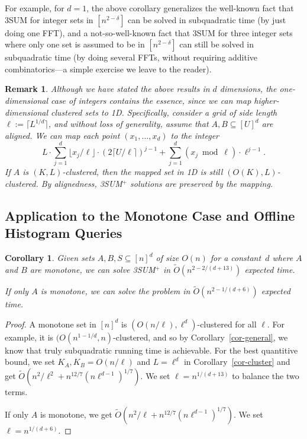 \documentclass[11pt]{article}
\newcommand{\LONG}[1]{#1}\newcommand{\SHORT}[1]{}
\newtheorem{corollary}[theorem]{Corollary}
\newtheorem{rmk}[theorem]{Remark}
\newenvironment{remark}{\begin{rmk}\em}{\end{rmk}}
\newcommand{\OO}{\widetilde{O}}
\begin{document}
For example, for $d=1$, the above corollary generalizes the well-known
fact that 3SUM for integer sets in $[n^{2-\delta}]$ can be
solved in subquadratic time (by just doing one FFT), and
a not-so-well-known fact that 3SUM for three integer sets where
only one set is assumed to be in $[n^{2-\delta}]$ can still be solved
in subquadratic time (by doing several FFTs, without requiring additive combinatorics---a simple exercise we leave to the reader).

\SHORT{
Although we have stated the above results in $d$ dimensions,
the one-dimensional case of integers contains the essence, since we can
map higher-dimensional clustered sets to 1D, as noted in the full
paper.
}
\LONG{
\begin{remark}
Although we have stated the above results in $d$ dimensions,
the one-dimensional case of integers contains the essence, since we can
map higher-dimensional clustered sets to 1D\@.
Specifically,
consider a grid of side length $\ell := \lceil L^{1/d}\rceil$, and
without loss of generality,
assume that $A,B\subseteq [U]^d$ are aligned.
We can map each point $(x_1,\ldots,x_d)$ to the integer
\[
 L\cdot \sum_{j=1}^d \lfloor x_j/\ell\rfloor\cdot (2\lceil U/\ell\rceil)^{j-1}
 + \sum_{j=1}^d (x_j\bmod{\ell})\cdot \ell^{j-1}.
\]
If $A$ is $(K,L)$-clustered, then the mapped set in 1D is
still $(O(K),L)$-clustered.  By alignedness,
3SUM$^+$ solutions are preserved by the mapping.
\end{remark}
}

\subsection{Application to the Monotone Case and Offline Histogram
Queries}

\begin{corollary}\label{cor-monotone-offline}
Given sets $A,B,S\subseteq [n]^d$ of size $O(n)$ for a constant~$d$
where $A$ and $B$ are monotone,
we can solve 3SUM$^+$ in
$\OO(n^{2-2/(d+13)})$ expected time.

If only $A$ is monotone, we can solve the
problem in $\OO(n^{2-1/(d+6)})$ expected time.
\end{corollary}
\begin{proof}
A monotone set in $[n]^d$ is $(O(n/\ell),\ell^d)$-clustered
for all $\ell$.  For example, it is $(O(n^{1-1/d},n)$-clustered,
and so by Corollary~\ref{cor-general}, we know that truly
subquadratic running time is achievable.
For the best quantitive bound, we set
$K_A,K_B=O(n/\ell)$ and $L=\ell^d$ in Corollary~\ref{cor-cluster}
and get
$\OO(n^2/\ell^2 + n^{12/7}(n\ell^{d-1})^{1/7}).$
We set $\ell = n^{1/(d+13)}$ to balance the two terms.

If only $A$ is monotone, we get
$\OO(n^2/\ell + n^{12/7}(n\ell^{d-1})^{1/7}).$
We set $\ell = n^{1/(d+6)}$.
\end{proof}
\end{document}
